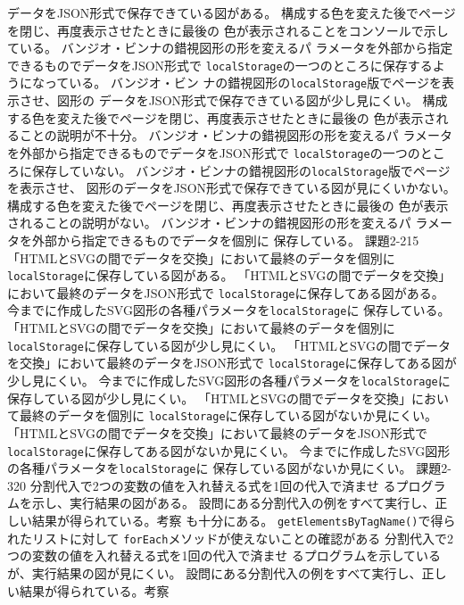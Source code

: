 \documentclass[a4j]{jreport}
\begin{document}
{{{{				データをJSON形式で保存できている図がある。}
	{構成する色を変えた後でページを閉じ、再度表示させたときに最後の
	色が表示されることをコンソールで示している。}
	{バンジオ・ビンナの錯視図形の形を変えるパ
				ラメータを外部から指定できるものでデータをJSON形式で
				\texttt{localStorage}の一つのところに保存するようになっている。}
}
{
	{バンジオ・ビン
				ナの錯視図形の\texttt{localStorage}版でページを表示させ、図形の
				データをJSON形式で保存できている図が少し見にくい。}
	{構成する色を変えた後でページを閉じ、再度表示させたときに最後の
	色が表示されることの説明が不十分。}
	{バンジオ・ビンナの錯視図形の形を変えるパ
				ラメータを外部から指定できるものでデータをJSON形式で
				\texttt{localStorage}の一つのところに保存していない。}
}
{
	{バンジオ・ビンナの錯視図形の\texttt{localStorage}版でページを表示させ、
	図形のデータをJSON形式で保存できている図が見にくいかない。}
	{構成する色を変えた後でページを閉じ、再度表示させたときに最後の
	色が表示されることの説明がない。}
	{バンジオ・ビンナの錯視図形の形を変えるパ
				ラメータを外部から指定できるものでデータを個別に
				保存している。}
}
{\ResultA}
{課題2-2}{15}
{
 {「HTMLとSVGの間でデータを交換」において最終のデータを個別に
 \texttt{localStorage}に保存している図がある。}
 {「HTMLとSVGの間でデータを交換」において最終のデータをJSON形式で
 \texttt{localStorage}に保存してある図がある。}
 {今までに作成したSVG図形の各種パラメータを\texttt{localStorage}に
				保存している。}
}
{
 {「HTMLとSVGの間でデータを交換」において最終のデータを個別に
 \texttt{localStorage}に保存している図が少し見にくい。}
 {「HTMLとSVGの間でデータを交換」において最終のデータをJSON形式で
 \texttt{localStorage}に保存してある図が少し見にくい。}
 {今までに作成したSVG図形の各種パラメータを\texttt{localStorage}に
				保存している図が少し見にくい。}
}
{
 {「HTMLとSVGの間でデータを交換」において最終のデータを個別に
 \texttt{localStorage}に保存している図がないか見にくい。}
 {「HTMLとSVGの間でデータを交換」において最終のデータをJSON形式で
 \texttt{localStorage}に保存してある図がないか見にくい。}
 {今までに作成したSVG図形の各種パラメータを\texttt{localStorage}に
				保存している図がないか見にくい。}
}
{\ResultA}
{課題2-3}{20}
{
  {分割代入で2つの変数の値を入れ替える式を1回の代入で済ませ
				るプログラムを示し、実行結果の図がある。}
  {設問にある分割代入の例をすべて実行し、正しい結果が得られている。考察
	も十分にある。}
	{\texttt{getElementsByTagName()}で得られたリストに対して
	\texttt{forEach}メソッドが使えないことの確認がある}
}
{
  {分割代入で2つの変数の値を入れ替える式を1回の代入で済ませ
				るプログラムを示しているが、実行結果の図が見にくい。}
  {設問にある分割代入の例をすべて実行し、正しい結果が得られている。考察
}}}}
\end{document}
